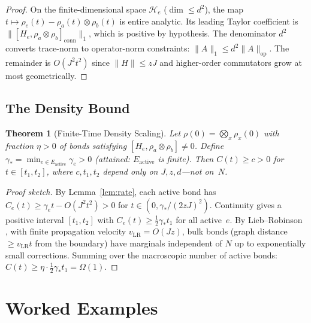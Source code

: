 \documentclass[12pt,a4paper]{amsart}
\theoremstyle{plain}
\newtheorem{theorem}{Theorem}[section]
\theoremstyle{definition}
\theoremstyle{remark}
\newcommand{\op}{\mathrm{op}}
\begin{document}
\begin{proof}
On the finite-dimensional space $\mathcal{H}_e$
($\dim \leq d^2$), the map
$t \mapsto \rho_e(t) - \rho_a(t) \otimes \rho_b(t)$ is entire
analytic. Its leading Taylor coefficient is
$\|[H_e, \rho_a \otimes \rho_b]_{\mathrm{conn}}\|_1$, which is
positive by hypothesis. The denominator $d^2$ converts trace-norm to
operator-norm constraints:
$\|A\|_1 \leq d^2 \|A\|_{\op}$. The remainder is $O(J^2 t^2)$ since
$\|H\| \leq z J$ and higher-order commutators grow at most
geometrically.
\end{proof}

\subsection{The Density Bound}

\begin{theorem}[Finite-Time Density Scaling]\label{thm:density}
Let $\rho(0) = \bigotimes_x \rho_x(0)$ with fraction $\eta > 0$ of
bonds satisfying $[H_e, \rho_a \otimes \rho_b] \neq 0$. Define
$\gamma_* = \min_{e \in E_{\mathrm{active}}} \gamma_e > 0$
(attained: $E_{\mathrm{active}}$ is finite). Then $C(t) \geq c > 0$
for $t \in [t_1, t_2]$, where $c, t_1, t_2$ depend only on
$J, z, d$---not on~$N$.
\end{theorem}

\begin{proof}[Proof sketch]
By Lemma~\ref{lem:rate}, each active bond has
$C_e(t) \geq \gamma_e t - O(J^2 t^2) > 0$ for
$t \in (0, \gamma_*/(2zJ)^2)$. Continuity gives a positive interval
$[t_1, t_2]$ with $C_e(t) \geq \tfrac{1}{2}\gamma_* t_1$ for all
active~$e$. By Lieb--Robinson \cite{LR72,NS06}, with finite
propagation velocity $v_{\mathrm{LR}} = O(Jz)$, bulk bonds (graph
distance $\geq v_{\mathrm{LR}} t$ from the boundary) have marginals
independent of $N$ up to exponentially small corrections. Summing over
the macroscopic number of active bonds:
$C(t) \geq \eta \cdot \tfrac{1}{2}\gamma_* t_1 = \Omega(1)$.
\end{proof}



\section{Worked Examples}\label{sec:examples}
\end{document}
